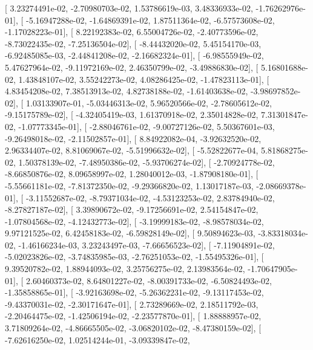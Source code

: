 \documentclass{article}
\begin{document}
       [  3.23274491e-02,  -2.70980703e-02,   1.53786619e-03,
          3.48336933e-02,  -1.76262976e-01],
       [ -5.16947288e-02,  -1.64869391e-02,   1.87511364e-02,
         -6.57573608e-02,  -1.17028223e-01],
       [  8.22192383e-02,   6.55004726e-02,  -2.40773596e-02,
         -8.73022435e-02,  -7.25136504e-02],
       [ -8.44432020e-02,   5.45154170e-03,  -6.92485085e-03,
         -2.44841208e-02,  -2.16682324e-01],
       [ -6.98555949e-02,   5.47627964e-02,  -9.11972169e-02,
          2.46350799e-02,  -3.49886830e-02],
       [  5.16801688e-02,   1.43848107e-02,   3.55242273e-02,
          4.08286425e-02,  -1.47823113e-01],
       [  4.83454208e-02,   7.38513913e-02,   4.82738188e-02,
         -1.61403638e-02,  -3.98697852e-02],
       [  1.03133907e-01,  -5.03446313e-02,   5.96520566e-02,
         -2.78605612e-02,  -9.15175789e-02],
       [ -4.32405419e-03,   1.61370918e-02,   2.35014828e-02,
          7.31301847e-02,  -1.07773345e-01],
       [ -2.88046761e-02,  -9.00727126e-02,   5.50367601e-03,
         -9.26498018e-02,  -2.11502857e-01],
       [  8.84922082e-04,  -3.92632520e-02,   2.96334407e-02,
          8.81069067e-02,  -5.51996632e-02],
       [ -5.52822677e-04,   5.81868275e-02,   1.50378139e-02,
         -7.48950386e-02,  -5.93706274e-02],
       [ -2.70924778e-02,  -8.66850876e-02,   8.09658997e-02,
          1.28040012e-03,  -1.87908180e-01],
       [ -5.55661181e-02,  -7.81372350e-02,  -9.29366820e-02,
          1.13017187e-03,  -2.08669378e-01],
       [ -3.11552687e-02,  -8.79371034e-02,  -4.53123253e-02,
          2.83784940e-02,  -8.27827187e-02],
       [  3.39890672e-02,  -9.17256691e-02,   2.54154847e-02,
         -1.07804568e-02,  -4.12432773e-02],
       [ -3.19999183e-02,  -8.98578034e-02,   9.97121525e-02,
          6.42458183e-02,  -6.59828149e-02],
       [  9.50894623e-03,  -3.83318034e-02,  -1.46166234e-03,
          3.23243497e-03,  -7.66656523e-02],
       [ -7.11904891e-02,  -5.02023826e-02,  -3.74835985e-03,
         -2.76251053e-02,  -1.55495326e-01],
       [  9.39520782e-02,   1.88944093e-02,   3.25756275e-02,
          2.13983564e-02,  -1.70647905e-01],
       [  2.60460373e-02,   8.64801227e-02,  -8.00391733e-02,
         -6.50824493e-02,  -1.35858865e-01],
       [ -3.92163698e-02,  -5.26362231e-02,  -9.13117453e-02,
         -9.43370031e-02,  -2.30171647e-01],
       [  2.73289669e-02,   2.18511792e-03,  -2.20464475e-02,
         -1.42506194e-02,  -2.23577870e-01],
       [  1.88888957e-02,   3.71809264e-02,  -4.86665505e-02,
         -3.06820102e-02,  -8.47380159e-02],
       [ -7.62616250e-02,   1.02514244e-01,  -3.09339847e-02,
\end{document}
